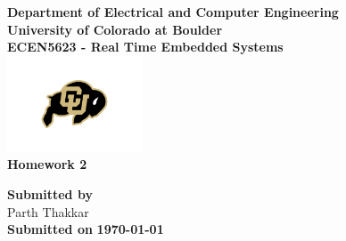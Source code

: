 \begin{titlepage}
\center %

\textbf{\large Department of Electrical and Computer Engineering}\\[0.5cm]
\textbf{\Large University of Colorado at Boulder}\\[1cm]
\textbf{\large ECEN5623 - Real Time Embedded Systems }\\[2cm]
\includegraphics[width=0.3\textwidth]{figures/cu}\\[2cm]

	
\textbf{\Huge Homework 2 }\\[0.2cm]





\vfill

\textbf{\large Submitted by}\\[0.5cm]

{\large Parth Thakkar}\\[0.5cm]	


\textbf{\large Submitted on}
\textbf{\Large \today} %


\vfill %

\end{titlepage}